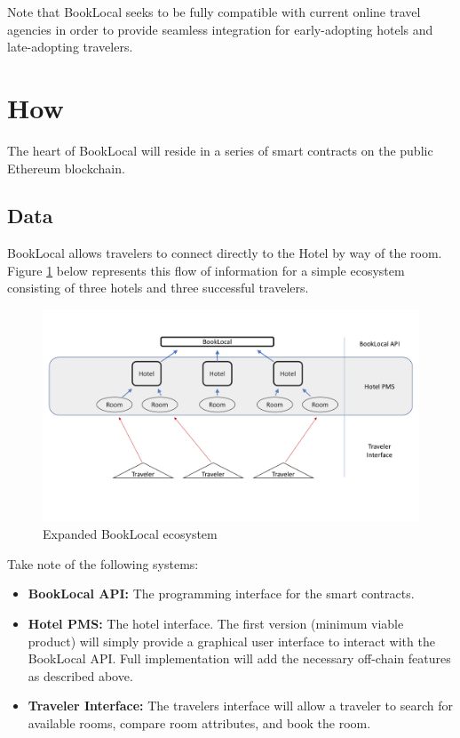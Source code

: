 \documentclass{article}
\begin{document}
\begin{flushleft}
Note that BookLocal seeks to be fully compatible with current online travel agencies in order to provide seamless integration for early-adopting hotels and late-adopting travelers. 
\end{flushleft}



\newpage
\section{How}
The heart of BookLocal will reside in a series of smart contracts on the public Ethereum blockchain. 
\subsection{Data}
\begin{flushleft}
BookLocal allows travelers to connect directly to the Hotel by way of the room. Figure \ref{blExp} below represents this flow of information for a simple ecosystem consisting of three hotels and three successful travelers. 
\end{flushleft}

\begin{figure}[H]
\centering
\includegraphics[width = .9\textwidth]{bookLocal_ecosystem2.pdf}
\caption{Expanded BookLocal ecosystem}
\label{blExp}
\end{figure}

Take note of the following systems: 
\begin{itemize}
\item \textbf{BookLocal API:} The programming interface for the smart contracts. 
\item \textbf{Hotel PMS:} The hotel interface. The first version (minimum viable product) will simply provide a graphical user interface to interact with the BookLocal API. Full implementation will add the necessary off-chain features as described above.
\item \textbf{Traveler Interface:} The travelers interface will allow a traveler to search for available rooms, compare room attributes, and book the room. 
\end{itemize}
\end{document}
